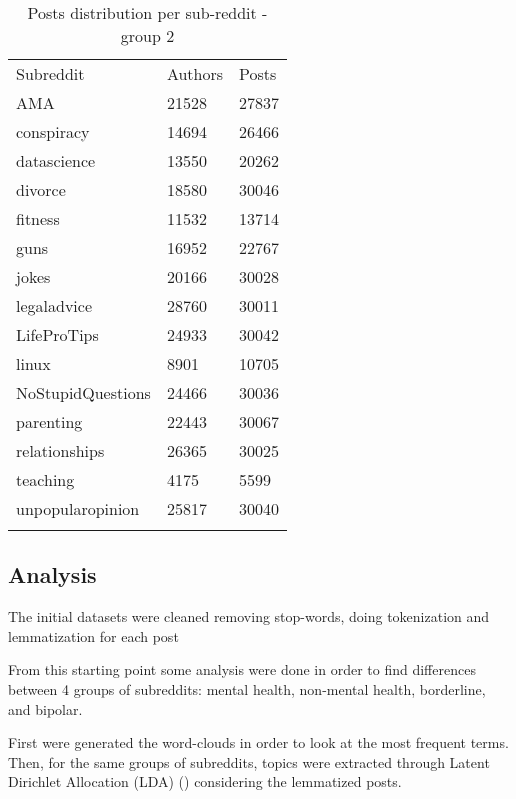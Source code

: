 \documentclass{article}
\begin{document}
\begin{minipage}{0.5\linewidth}
	\bigskip\bigskip\bigskip\bigskip
\begin{table}[H]
	\label{tab:stat2}
	\centering  
	\begin{tabular}{lll}
		\hline\noalign{\smallskip}
		Subreddit 				& Authors & Posts  \\
		\noalign{\smallskip}\hline\noalign{\smallskip}
		AMA						&	21528	&	27837	\\
		conspiracy				&	14694	&	26466	\\
		datascience				&	13550	&	20262	\\
		divorce					&	18580	&	30046	\\
		fitness					&	11532	&	13714	\\
		guns					&	16952	&	22767	\\
		jokes					&	20166	&	30028	\\
		legaladvice				&	28760	&	30011	\\
		LifeProTips				&	24933	&	30042	\\
		linux					&	8901	&	10705	\\
		NoStupidQuestions		&	24466	&	30036	\\
		parenting				&	22443	&	30067	\\
		relationships			&	26365	&	30025	\\
		teaching				&	4175	&	5599	\\
		unpopularopinion		&	25817	&	30040	\\
		\noalign{\smallskip}\hline
	\end{tabular}
	\caption {Posts distribution per sub-reddit - group 2}
\end{table}
\end{minipage}

\bigskip

\subsection{Analysis}

The initial datasets were cleaned removing stop-words, doing tokenization and lemmatization for each post%

From this starting point some analysis were done in order to find differences between 4 groups of subreddits: mental health, non-mental health, borderline, and bipolar. 


First were generated the word-clouds in order to look at the most frequent terms. Then, for the same groups of subreddits, topics were extracted through Latent Dirichlet Allocation (LDA) (\cite{blei2003latent}) considering the lemmatized posts.
\end{document}
